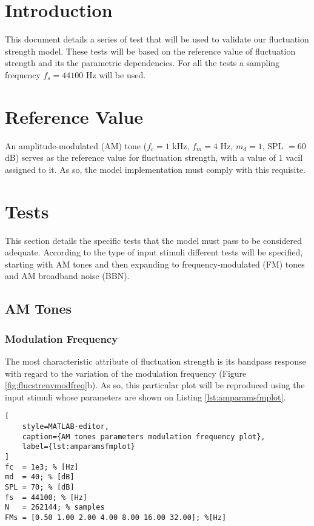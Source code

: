 \documentclass[a4paper]{article}
\begin{document}

\section{Introduction}

This document details a series of test that will be used to validate our
fluctuation strength model. These tests will be based on the reference value of
fluctuation strength and its the parametric dependencies. For all the tests a
sampling frequency $f_s = 44100 $ Hz will be used.

\section{Reference Value}

An amplitude-modulated (AM) tone ($f_c = 1$ kHz, $f_m = 4$ Hz, $m_d = 1$,
SPL $=60$ dB) serves as the reference value for fluctuation strength, with a
value of 1 vacil assigned to it. As so, the model implementation must comply
with this requisite.

\section{Tests}

This section details the specific tests that the model must pass to be
considered adequate. According to the type of input stimuli different tests
will be specified, starting with AM tones and then expanding to
frequency-modulated (FM) tones and AM broadband noise (BBN).

\subsection{AM Tones}

\subsubsection{Modulation Frequency}

The most characteristic attribute of fluctuation strength is its bandpass
response with regard to the variation of the modulation frequency (Figure
\ref{fig:flucstrenvmodfreq}b). As so, this particular plot will be reproduced
using the input stimuli whose parameters are shown on Listing
\ref{lst:amparamsfmplot}.

\begin{lstlisting}[
    style=MATLAB-editor,
    caption={AM tones parameters modulation frequency plot},
    label={lst:amparamsfmplot}
]
fc  = 1e3; % [Hz]
md  = 40; % [dB]
SPL = 70; % [dB]
fs  = 44100; % [Hz]
N   = 262144; % samples
FMs = [0.50 1.00 2.00 4.00 8.00 16.00 32.00]; %[Hz]
\end{lstlisting}
\end{document}

